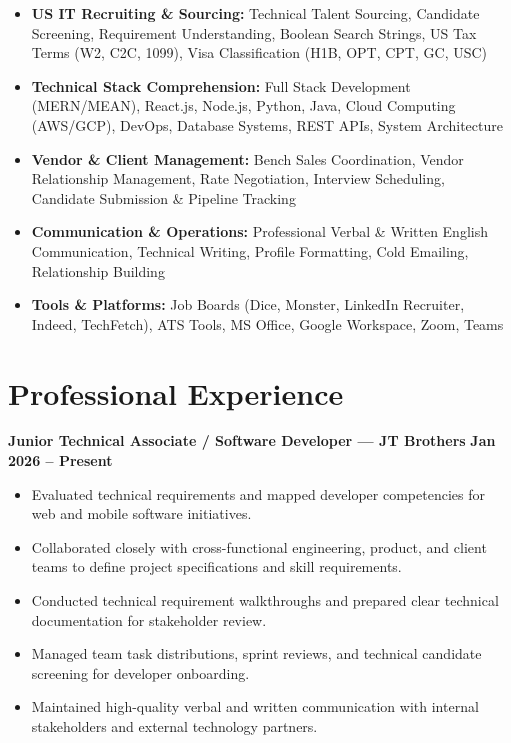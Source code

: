 \documentclass[a4paper,10pt]{article}
\begin{document}
\begin{itemize}

    \item \textbf{US IT Recruiting \& Sourcing:}
    Technical Talent Sourcing, Candidate Screening, Requirement Understanding,
    Boolean Search Strings, US Tax Terms (W2, C2C, 1099), Visa Classification (H1B, OPT, CPT, GC, USC)

    \item \textbf{Technical Stack Comprehension:}
    Full Stack Development (MERN/MEAN), React.js, Node.js, Python, Java,
    Cloud Computing (AWS/GCP), DevOps, Database Systems, REST APIs, System Architecture

    \item \textbf{Vendor \& Client Management:}
    Bench Sales Coordination, Vendor Relationship Management, Rate Negotiation,
    Interview Scheduling, Candidate Submission \& Pipeline Tracking

    \item \textbf{Communication \& Operations:}
    Professional Verbal \& Written English Communication, Technical Writing,
    Profile Formatting, Cold Emailing, Relationship Building

    \item \textbf{Tools \& Platforms:}
    Job Boards (Dice, Monster, LinkedIn Recruiter, Indeed, TechFetch),
    ATS Tools, MS Office, Google Workspace, Zoom, Teams

\end{itemize}

\section*{Professional Experience}

\textbf{Junior Technical Associate / Software Developer --- JT Brothers}
\hfill
\textbf{Jan 2026 -- Present}

\begin{itemize}

    \item Evaluated technical requirements and mapped developer competencies for web and mobile software initiatives.

    \item Collaborated closely with cross-functional engineering, product, and client teams to define project specifications and skill requirements.

    \item Conducted technical requirement walkthroughs and prepared clear technical documentation for stakeholder review.

    \item Managed team task distributions, sprint reviews, and technical candidate screening for developer onboarding.

    \item Maintained high-quality verbal and written communication with internal stakeholders and external technology partners.

\end{itemize}
\end{document}
